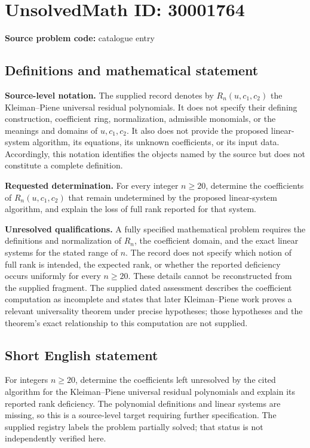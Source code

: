 \documentclass[11pt]{article}
\begin{document}
\section*{UnsolvedMath ID: 30001764}
\textbf{Source problem code:} catalogue entry
\subsection{Definitions and mathematical statement}
\textbf{Source-level notation.} The supplied record denotes by \(R_n(u,c_1,c_2)\) the Kleiman--Piene universal residual polynomials. It does not specify their defining construction, coefficient ring, normalization, admissible monomials, or the meanings and domains of \(u,c_1,c_2\). It also does not provide the proposed linear-system algorithm, its equations, its unknown coefficients, or its input data. Accordingly, this notation identifies the objects named by the source but does not constitute a complete definition.

\textbf{Requested determination.} For every integer \(n\geq 20\), determine the coefficients of \(R_n(u,c_1,c_2)\) that remain undetermined by the proposed linear-system algorithm, and explain the loss of full rank reported for that system.

\textbf{Unresolved qualifications.} A fully specified mathematical problem requires the definitions and normalization of \(R_n\), the coefficient domain, and the exact linear systems for the stated range of \(n\). The record does not specify which notion of full rank is intended, the expected rank, or whether the reported deficiency occurs uniformly for every \(n\geq20\). These details cannot be reconstructed from the supplied fragment. The supplied dated assessment describes the coefficient computation as incomplete and states that later Kleiman--Piene work proves a relevant universality theorem under precise hypotheses; those hypotheses and the theorem's exact relationship to this computation are not supplied.
\subsection{Short English statement}
For integers \(n\geq20\), determine the coefficients left unresolved by the cited algorithm for the Kleiman--Piene universal residual polynomials and explain its reported rank deficiency. The polynomial definitions and linear systems are missing, so this is a source-level target requiring further specification. The supplied registry labels the problem partially solved; that status is not independently verified here.
\end{document}
